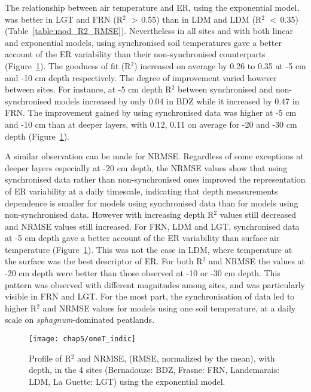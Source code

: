 The relationship between air temperature and ER, using the exponential model, was better in LGT and FRN (R$^{2}$ $>$\,0.55) than in LDM and LDM (R$^{2}$ $<$\,0.35) (Table~\ref{table:mod_R2_RMSE}).
Nevertheless in all sites and with both linear and exponential models, using synchronised  soil temperatures gave a better account of the ER variability than their non-synchronised counterparts (Figure~\ref{fig:models_comparison}).
The goodness of fit (R$^2$) increased on average by 0.26 to 0.35 at -5 cm and -10 cm depth respectively.
The degree of improvement varied however between sites.
For instance, at -5 cm depth R$^2$ between synchronised and non-synchronised models increased by only 0.04 in BDZ while it increased by 0.47 in FRN.
The improvement gained by using synchronised data was higher at -5 cm and -10 cm than at deeper layers, with 0.12, 0.11 on average for -20 and -30 cm depth (Figure~\ref{fig:models_comparison}).

A similar observation can be made for NRMSE.
Regardless of some exceptions at deeper layers especially at -20 cm depth, the NRMSE values show that using synchronised data rather than non-synchronised ones improved the representation of ER variability at a daily timescale, indicating that depth measurements dependence is smaller for models using synchronised data than for models using non-synchronised data.
However with increasing depth R$^{2}$ values still decreased and NRMSE values still increased.
For FRN, LDM and LGT, synchronised data at -5 cm depth gave a better account of the ER variability than surface air temperature (Figure~\ref{fig:models_comparison}).
This was not the case in LDM, where temperature at the surface was the best descriptor of ER.
For both R$^{2}$ and NRMSE the values at -20 cm depth were better than those observed at -10 or -30 cm depth.
This pattern was observed with different magnitudes among sites, and was particularly visible in FRN and LGT.
For the most part, the synchronisation of data led to higher R$^{2}$ and NRMSE values for models using one soil temperature, at a daily scale on \textit{sphagnum}-dominated peatlands.

\begin{figure}[]
\centering
\texttt{[image: chap5/oneT\_indic]}
\caption{Profile of R$^{2}$ and NRMSE, (RMSE, normalized by the mean), with depth, in the 4 sites (Bernadouze: BDZ, Frasne: FRN, Landemarais: LDM, La Guette: LGT) using the exponential model.}
\label{fig:models_comparison}
\end{figure}

